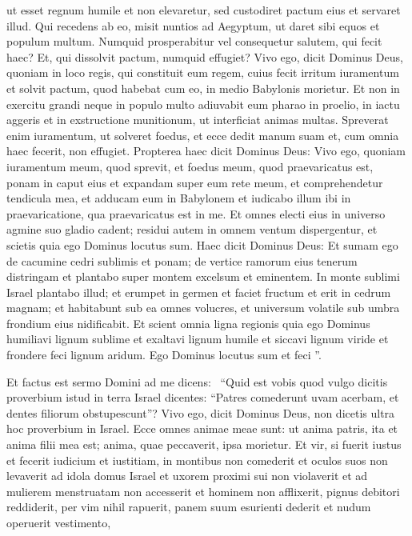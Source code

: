 \begin{biblechapter}
\begin{biblechapter}
\begin{biblechapter}
\begin{biblechapter}
\begin{biblechapter}
\begin{biblechapter}
\begin{biblechapter}
\begin{biblechapter}
\begin{biblechapter}
\begin{biblechapter}
\begin{biblechapter}
\begin{biblechapter}
\begin{biblechapter}
\begin{biblechapter}
\begin{biblechapter}
\begin{biblechapter}
\begin{biblechapter}
\verse ut esset regnum humile et non elevaretur, sed custodiret pactum eius et servaret illud. 
\verse Qui recedens ab eo, misit nuntios ad Aegyptum, ut daret sibi equos et populum multum. Numquid prosperabitur vel consequetur salutem, qui fecit haec? Et, qui dissolvit pactum, numquid effugiet? 
\verse Vivo ego, dicit Dominus Deus, quoniam in loco regis, qui constituit eum regem, cuius fecit irritum iuramentum et solvit pactum, quod habebat cum eo, in medio Babylonis morietur. 
\verse Et non in exercitu grandi neque in populo multo adiuvabit eum pharao in proelio, in iactu aggeris et in exstructione munitionum, ut interficiat animas multas. 
\verse Spreverat enim iuramentum, ut solveret foedus, et ecce dedit manum suam et, cum omnia haec fecerit, non effugiet.
 \verse Propterea haec dicit Dominus Deus: Vivo ego, quoniam iuramentum meum, quod sprevit, et foedus meum, quod praevaricatus est, ponam in caput eius 
\verse et expandam super eum rete meum, et comprehendetur tendicula mea, et adducam eum in Babylonem et iudicabo illum ibi in praevaricatione, qua praevaricatus est in me. 
\verse Et omnes electi eius in universo agmine suo gladio cadent; residui autem in omnem ventum dispergentur, et scietis quia ego Dominus locutus sum.
 \verse Haec dicit Dominus Deus:
 Et sumam ego de cacumine cedri sublimis et ponam;
 de vertice ramorum eius tenerum distringam
 et plantabo super montem excelsum et eminentem.
 \verse In monte sublimi Israel plantabo illud;
 et erumpet in germen et faciet fructum
 et erit in cedrum magnam;
 et habitabunt sub ea omnes volucres,
 et universum volatile sub umbra frondium eius nidificabit.
 \verse Et scient omnia ligna regionis
 quia ego Dominus
 humiliavi lignum sublime
 et exaltavi lignum humile
 et siccavi lignum viride
 et frondere feci lignum aridum.
 Ego Dominus locutus sum et feci ”. 
  
\begin{biblechapter}
\verse Et factus est sermo Domini ad me dicens: 
 \verse “Quid est vobis quod vulgo dicitis proverbium istud in terra Israel dicentes:
 “Patres comederunt uvam acerbam,
 et dentes filiorum obstupescunt”?
 \verse Vivo ego, dicit Dominus Deus, non dicetis ultra hoc proverbium in Israel. 
 \verse Ecce omnes animae meae sunt: ut anima patris, ita et anima filii mea est; anima, quae peccaverit, ipsa morietur. 
\verse Et vir, si fuerit iustus et fecerit iudicium et iustitiam, 
\verse in montibus non comederit et oculos suos non levaverit ad idola domus Israel et uxorem proximi sui non violaverit et ad mulierem menstruatam non accesserit 
\verse et hominem non afflixerit, pignus debitori reddiderit, per vim nihil rapuerit, panem suum esurienti dederit et nudum operuerit vestimento, 

\end{biblechapter}
\end{biblechapter}
\end{biblechapter}
\end{biblechapter}
\end{biblechapter}
\end{biblechapter}
\end{biblechapter}
\end{biblechapter}
\end{biblechapter}
\end{biblechapter}
\end{biblechapter}
\end{biblechapter}
\end{biblechapter}
\end{biblechapter}
\end{biblechapter}
\end{biblechapter}
\end{biblechapter}
\end{biblechapter}
